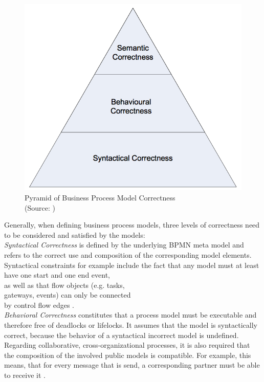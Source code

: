 \begin{figure}
\vspace{-0.5cm}
\includegraphics[width=0.9\linewidth]{src/images/correctness_levels.png}
\caption{Pyramid of Business Process Model Correctness\\(Source: \cite{sabrina848})}
\label{fig:bpm_correctness}
\end{figure}

Generally, when defining business process models, three levels of correctness need to be considered and satisfied by the models:\\

\textit{Syntactical Correctness} is defined by the underlying BPMN meta model and refers to the correct use and composition of the corresponding model elements. Syntactical constraints for example include the fact that any model must at least  have one start and one end event,\\ 
as well as  that flow  objects (e.g. tasks,\\ 
gateways, events) can only be connected\\
by control flow edges \cite{sabrina848}. \\

\textit{Behavioral Correctness} constitutes that a process model must be executable and therefore free of deadlocks or lifelocks. It assumes that the model is syntactically correct, because the behavior of a syntactical incorrect model is undefined. Regarding collaborative, cross-organizational processes, it is also required that the composition of the involved public models is compatible. For example, this means, that for every message that is send, a corresponding partner must be able to receive it \cite{sabrina1174, sabrina848}. \\


